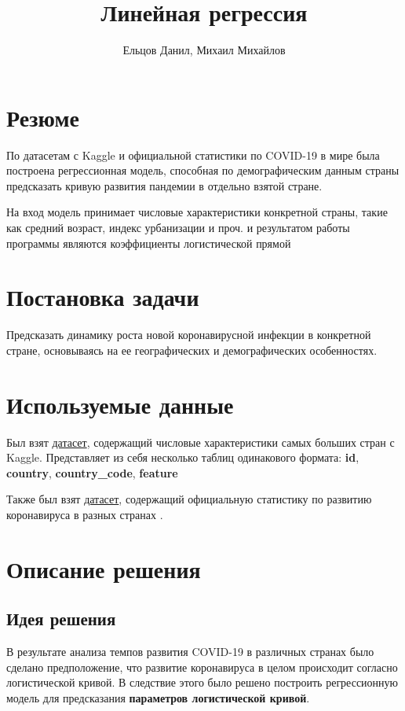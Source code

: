 \documentclass{article}
\title{Линейная регрессия}
\author{Ельцов Данил, Михаил Михайлов}
\begin{document}
\maketitle

\tableofcontents

\section*{Резюме}
По датасетам с Kaggle и официальной статистики по COVID-19 в мире была построена регрессионная модель, способная по демографическим данным страны предсказать кривую развития
пандемии в отдельно взятой стране.

На вход модель принимает числовые характеристики конкретной страны, такие как средний возраст, индекс урбанизации и проч. и результатом работы программы являются коэффициенты логистической прямой
\newpage

\section{Постановка задачи}
Предсказать динамику роста новой коронавирусной инфекции в конкретной стране, основываясь на ее географических и демографических особенностях.

\section{Используемые данные}
Был взят \href{https://www.kaggle.com/daniboy370/world-data-by-country-2020}{датасет}, содержащий числовые характеристики самых больших стран с Kaggle. Представляет из себя несколько таблиц одинакового формата: \textbf{id}, \textbf{country}, \textbf{country\_code}, \textbf{feature}

Также был взят \href{https://www.ecdc.europa.eu/en/publications-data/download-todays-data-geographic-distribution-covid-19-cases-worldwide}{датасет}, содержащий официальную статистику по развитию коронавируса в разных странах
.
\section{Описание решения}
\subsection{Идея решения}
В результате анализа темпов развития COVID-19 в различных странах было сделано предположение, что развитие коронавируса в целом происходит согласно логистической кривой. В следствие этого было решено построить регрессионную модель для предсказания \textbf{параметров логистической кривой}.
\end{document}
